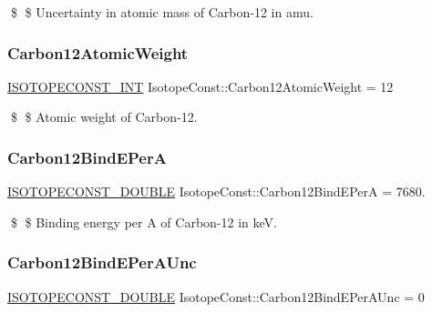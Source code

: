 \$ \$ Uncertainty in atomic mass of Carbon-\/12 in amu. \mbox{\label{group___isotope_const-_carbon-_c12_ga55d02afb466b5d3c3489a520d5cea78e}} 
\subsubsection{\texorpdfstring{Carbon12\+Atomic\+Weight}{Carbon12AtomicWeight}}
{\footnotesize\ttfamily \mbox{\hyperlink{group___isotope_const-_macros_ga5f18360b3e99483a35c32d789e62621c}{I\+S\+O\+T\+O\+P\+E\+C\+O\+N\+S\+T\+\_\+\+I\+NT}} Isotope\+Const\+::\+Carbon12\+Atomic\+Weight = 12}

\$ \$ Atomic weight of Carbon-\/12. \mbox{\label{group___isotope_const-_carbon-_c12_gaea68a91d633bd5165d0dc6180ac1e5be}} 
\subsubsection{\texorpdfstring{Carbon12\+Bind\+E\+PerA}{Carbon12BindEPerA}}
{\footnotesize\ttfamily \mbox{\hyperlink{group___isotope_const-_macros_ga8f45a7272ce02c0b4c65c44636ed719a}{I\+S\+O\+T\+O\+P\+E\+C\+O\+N\+S\+T\+\_\+\+D\+O\+U\+B\+LE}} Isotope\+Const\+::\+Carbon12\+Bind\+E\+PerA = 7680.}

\$ \$ Binding energy per A of Carbon-\/12 in keV. \mbox{\label{group___isotope_const-_carbon-_c12_gabd9e3915b7688850cb51ca29de46271c}} 
\subsubsection{\texorpdfstring{Carbon12\+Bind\+E\+Per\+A\+Unc}{Carbon12BindEPerAUnc}}
{\footnotesize\ttfamily \mbox{\hyperlink{group___isotope_const-_macros_ga8f45a7272ce02c0b4c65c44636ed719a}{I\+S\+O\+T\+O\+P\+E\+C\+O\+N\+S\+T\+\_\+\+D\+O\+U\+B\+LE}} Isotope\+Const\+::\+Carbon12\+Bind\+E\+Per\+A\+Unc = 0}

